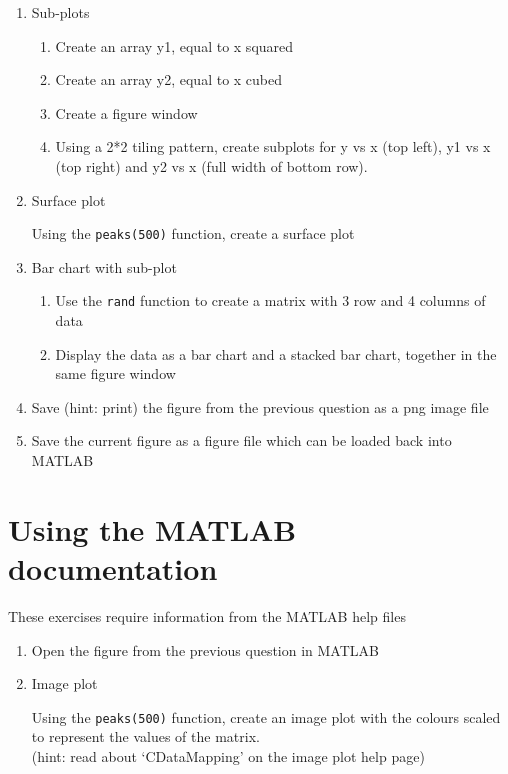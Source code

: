 \documentclass[a4paper]{article}
\begin{document}
\begin{enumerate}
	\item Sub-plots
	\begin{enumerate}
		\item Create an array y1, equal to x squared
		\item Create an array y2, equal to x cubed
		\item Create a figure window
		\item Using a 2*2 tiling pattern, create subplots for y vs x (top left), y1 vs x (top right) and y2 vs x (full width of bottom row). 
	\end{enumerate}
	
	\item Surface plot
	
	Using the \texttt{peaks(500)} function, create a surface plot 

	\item Bar chart with sub-plot
	\begin{enumerate}
		\item Use the \texttt{rand} function to create a matrix with 3 row and 4 columns of data
		\item Display the data as a bar chart and a stacked bar chart, together in the 	same figure window
	\end{enumerate}
	
	\item Save (hint: print) the figure from the previous question as a png image file
	
	\item Save the current figure as a figure file which can be loaded back into MATLAB

	
\end{enumerate}

\medskip

\section{Using the MATLAB documentation}
{\large These exercises require information from the MATLAB help files}
	\begin{enumerate}
		\item Open the figure from the previous question in MATLAB
		
		\item Image plot
		
		Using the \texttt{peaks(500)} function, create an image plot with the colours scaled to represent the values of the matrix.\\
		(hint: read about `CDataMapping' on the image plot help page)	
	\end{enumerate}
\end{document}
